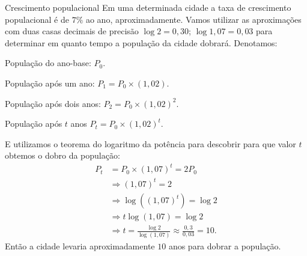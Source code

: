 \begin{example}{Crescimento populacional}
Em uma determinada cidade a taxa de crescimento populacional é de $7\%$ ao ano, aproximadamente. Vamos utilizar as aproximações com duas casas decimais de precisão $\log 2 = 0{,}30$; $\log 1{,}07 =0{,}03$ para determinar em quanto tempo a população da cidade dobrará. Denotamos:

População do ano-base: $P_0$.

População após um ano: $P_1=P_0 \times (1{,}02).$

População após dois anos: $P_2= P_0 \times (1{,}02)^2$.

População após $t$ anos $P_t =  P_0 \times (1{,}02)^t$.

E utilizamos o teorema do logaritmo da potência para descobrir para que valor $t$ obtemos o dobro da população:
\begin{align*}
P_t &= P_0 \times (1{,}07)^t = 2 P_0\\
&\Longrightarrow (1{,}07)^t = 2\\
&\Longrightarrow \log((1{,}07)^t) = \log 2\\
&\Longrightarrow t\log(1{,}07) = \log 2\\
&\Longrightarrow t = \frac{\log 2}{\log(1{,}07)}\approx\frac{0,3}{0,03}=10.
\end{align*}
Então a cidade levaria aproximadamente $10$ anos para dobrar a população.
\end{example}
\clearpage
\def\currentcolor{cor1}
